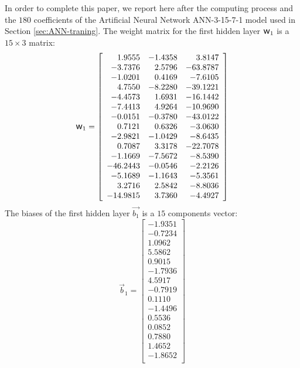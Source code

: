 \documentclass[algorithms,article,submit,pdftex,moreauthors]{Definitions/mdpi}
\DeclareRobustCommand{\w}{\mbox{\large\ensuremath{\mathsf{w}}}}
\begin{document}
In order to complete this paper, we report here after the computing process and the $180$ coefficients of the Artificial Neural Network ANN-3-15-7-1 model used in Section \ref{sec:ANN-traning}.
The weight matrix for the first hidden layer $\w_1$ is a $15\times3$ matrix:
\begin{equation*}
\w_1 = \left[
\begin{array}{rrr}
1.9555 & -1.4358 & 3.8147\\
-3.7376 & 2.5796 & -63.8787\\
-1.0201 & 0.4169 & -7.6105\\
4.7550 & -8.2280 & -39.1221\\
-4.4573 & 1.6931 & -16.1442\\
-7.4413 & 4.9264 & -10.9690\\
-0.0151 & -0.3780 & -43.0122\\
0.7121 & 0.6326 & -3.0630\\
-2.9821 & -1.0429 & -8.6435\\
0.7087 & 3.3178 & -22.7078\\
-1.1669 & -7.5672 & -8.5390\\
-46.2443 & -0.0546 & -2.2126\\
-5.1689 & -1.1643 & -5.3561\\
3.2716 & 2.5842 & -8.8036\\
-14.9815 & 3.7360 & -4.4927\\
\end{array}\right]
\end{equation*}
The biases of the first hidden layer $\overrightarrow{b_1}$ is a $15$ components vector:
\begin{equation*}
\overrightarrow{b}_1 = \left[
\begin{array}{r}
-1.9351\\
-0.7234\\
1.0962\\
5.5862\\
0.9015\\
-1.7936\\
4.5917\\
-0.7919\\
0.1110\\
-1.4496\\
0.5536\\
0.0852\\
0.7880\\
1.4652\\
-1.8652\\
\end{array}\right]
\end{equation*}
\end{document}
